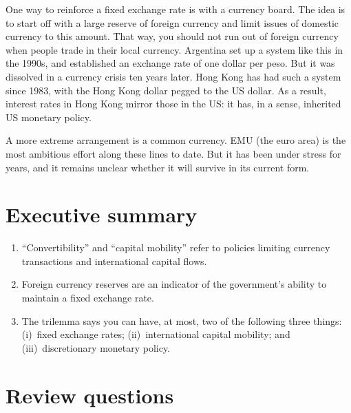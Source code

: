 One way to reinforce a fixed exchange rate is with a currency board.
The idea is to start off with a large reserve of foreign currency
and limit issues of domestic currency to this amount.
That way, you should not run out of foreign currency when people trade
in their local currency.
Argentina set up a system like this in the 1990s, and established
an exchange rate of one dollar per peso.
But it was dissolved in a currency crisis ten years later.
Hong Kong has had such a system since 1983, with the Hong Kong dollar
pegged to the US dollar.
As a result, interest rates in Hong Kong mirror those in the US:
it has, in a sense, inherited US monetary policy.


A more extreme arrangement is a common currency.
EMU (the euro area) is the most ambitious effort along these lines to date.
But it has been under stress for years, and it remains unclear whether
it will survive in its current form.


\section*{Executive summary}

\setlength{\leftmargini}{.5\oldleftmargini}
\begin{enumerate}
\item ``Convertibility'' and ``capital mobility'' refer to
policies limiting currency transactions and international capital flows.

\item Foreign currency reserves are an indicator of the
government's ability to maintain a fixed exchange rate.

\item The trilemma says you can have, at most, two of the following three
things:
(i)~fixed exchange rates;
(ii)~international capital mobility; and
(iii)~discretionary monetary policy.
\end{enumerate}
\setlength{\leftmargini}{\oldleftmargini}

\section*{Review questions}

